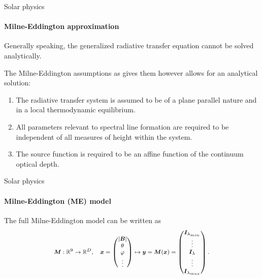 \documentclass{beamer}
\newcommand\vect[1]{\ensuremath{\bm{#1}}}
\begin{document}
\begin{frame}[allowframebreaks]{Solar physics}
\framesubtitle{Milne-Eddington approximation}
Generally speaking, the generalized radiative transfer equation cannot be solved analytically.

The Milne-Eddington assumptions as \cite[p.411]{DeglInnocenti.2005} gives them however allows for an analytical solution:
\begin{enumerate}
\item The radiative transfer system is assumed to be of a plane parallel nature and in a local thermodynamic equilibrium.
\item All parameters relevant to spectral line formation are required to be independent of all measures of height within the system.
\item The source function is required to be an affine function of the continuum optical depth.
\end{enumerate}
\end{frame}

\begin{frame}[allowframebreaks]{Solar physics}
\framesubtitle{Milne-Eddington (ME) model}
%

The full Milne-Eddington model can be written as \begin{gather}\footnotesize\begin{gathered}\label{eq:ME_model_equation}
\vect{M}:\mathbb{R}^9 \rightarrow \mathbb{R}^D, \quad \vect{x} = \begin{pmatrix}
|\vect{B}| \\
\theta \\
\varphi \\
\vdots
\end{pmatrix} \mapsto \vect{y} = \vect{M}(\vect{x}) = \begin{pmatrix}
\vect{I}_{\lambda_{min}} \\
\vdots \\
\vect{I}_{\lambda} \\
\vdots \\
\vect{I}_{\lambda_{max}}
\end{pmatrix}.
\end{gathered}\end{gather}
\end{frame}
\end{document}

